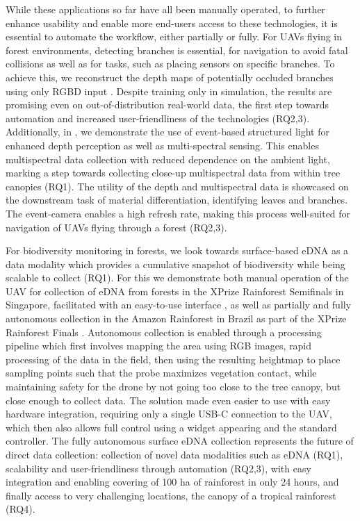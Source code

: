 While these applications so far have all been manually operated, to further enhance usability and enable more end-users access to these technologies, it is essential to automate the workflow, either partially or fully. For UAVs flying in forest environments, detecting branches is essential, for navigation to avoid fatal collisions as well as for tasks, such as placing sensors on specific branches. To achieve this, we reconstruct the depth maps of potentially occluded branches using only RGBD input \cite{OBR}. Despite training only in simulation, the results are promising even on out-of-distribution real-world data, the first step towards automation and increased user-friendliness of the technologies (RQ2,3). Additionally, in  \cite{}, we demonstrate the use of event-based structured light for enhanced depth perception as well as multi-spectral sensing. This enables multispectral data collection with reduced dependence on the ambient light, marking a step towards collecting close-up multispectral data from within tree canopies (RQ1). The utility of the depth and multispectral data is showcased on the downstream task of material differentiation, identifying leaves and branches. The event-camera enables a high refresh rate, making this process well-suited for navigation of UAVs flying through a forest (RQ2,3).

For biodiversity monitoring in forests, we look towards surface-based eDNA as a data modality which provides a cumulative snapshot of biodiversity while being scalable to collect (RQ1). For this we demonstrate both manual operation of the UAV for collection of eDNA from forests in the XPrize Rainforest Semifinals in Singapore, facilitated with an easy-to-use interface \cite{eprobe},  as well as partially and fully autonomous collection in the Amazon Rainforest in Brazil as part of the XPrize Rainforest Finals \cite{}. Autonomous collection is enabled through a processing pipeline which first involves mapping the area using RGB images, rapid processing of the data in the field, then using the resulting heightmap to place sampling points such that the probe maximizes vegetation contact, while maintaining safety for the drone by not going too close to the tree canopy, but close enough to collect data. The solution made even easier to use with easy hardware integration, requiring only a single USB-C connection to the UAV, which then also allows full control using a widget appearing and the standard controller. The fully autonomous surface eDNA collection represents the future of direct data collection: collection of novel data modalities such as eDNA (RQ1), scalability and user-friendliness through automation (RQ2,3), with easy integration and enabling covering of 100 ha of rainforest in only 24 hours, and finally access to very challenging locations, the canopy of a tropical rainforest (RQ4).

